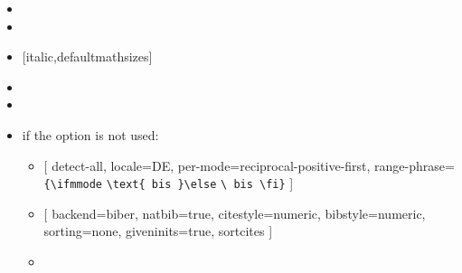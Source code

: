 \begin{multicols}{2}
\begin{itemize}
    \item {}
    \item {}
    \item {} [italic,defaultmathsizes]
    \item {}
    \item {}
    \item if the  option is not used:
      \begin{itemize}
        \item {}
          [%
            detect-all, locale=DE,
            per-mode=reciprocal-positive-first, range-phrase=%
            \verb|{\ifmmode|\hskip0pt
            \verb|\text{ bis }\else|\hskip0pt
            \verb|\ bis \fi}|%
          ]
        \item {}
          [%
            backend=biber, natbib=true, citestyle=numeric, bibstyle=numeric,
            sorting=none, giveninits=true, sortcites%
          ]
        \item {}
      \end{itemize}
  \end{itemize}
\end{multicols}%
